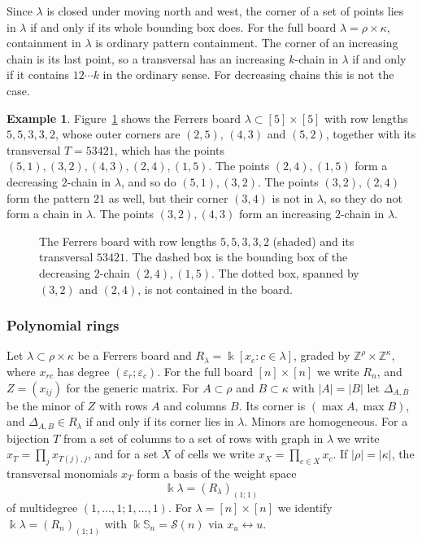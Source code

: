 \documentclass[11pt]{amsart}
\theoremstyle{definition}
\newtheorem{example}[theorem]{Example}
\theoremstyle{remark}
\newcommand{\bS}{\mathbb{S}}
\newcommand{\kk}{\Bbbk}
\newcommand{\cS}{\mathscr{S}}
\newcommand{\gridlines}[2]{\draw[gray!55,very thin] (0,0) grid (#1,-#2);}
\newcommand{\shaderows}[2][gray!22]{\foreach \x/\y in {#2}{\fill[#1] (0,1-\x) rectangle (\y,-\x);}}
\newcommand{\pt}[2]{\fill (#2-0.5,0.5-#1) circle (0.16);}
\begin{document}
Since $\lambda$ is closed under moving north and west, the corner of a set of points lies in $\lambda$ if and only if its whole bounding box does. For the full board $\lambda=\rho\times\kappa$, containment in $\lambda$ is ordinary pattern containment. The corner of an increasing chain is its last point, so a transversal has an increasing $k$-chain in $\lambda$ if and only if it contains $12\cdots k$ in the ordinary sense. For decreasing chains this is not the case.

\begin{example}\label{ex:board}
Figure~\ref{fig:board} shows the Ferrers board $\lambda\subset[5]\times[5]$ with row lengths $5,5,3,3,2$, whose outer corners are $(2,5)$, $(4,3)$ and $(5,2)$, together with its transversal $T=53421$, which has the points $(5,1),(3,2),(4,3),(2,4),(1,5)$. The points $(2,4),(1,5)$ form a decreasing $2$-chain in $\lambda$, and so do $(5,1),(3,2)$. The points $(3,2),(2,4)$ form the pattern $21$ as well, but their corner $(3,4)$ is not in $\lambda$, so they do not form a chain in $\lambda$. The points $(3,2),(4,3)$ form an increasing $2$-chain in $\lambda$.
\end{example}

\begin{figure}[ht]
\centering
{}
\caption{The Ferrers board with row lengths $5,5,3,3,2$ (shaded) and its transversal $53421$. The dashed box is the bounding box of the decreasing $2$-chain $(2,4),(1,5)$. The dotted box, spanned by $(3,2)$ and $(2,4)$, is not contained in the board.}\label{fig:board}
\end{figure}

\subsubsection{Polynomial rings}
Let $\lambda\subset\rho\times\kappa$ be a Ferrers board and $R_\lambda=\kk[x_c:c\in\lambda]$, graded by $\mathbb Z^\rho\times\mathbb Z^\kappa$, where $x_{rc}$ has degree $(\varepsilon_r;\varepsilon_c)$. For the full board $[n]\times[n]$ we write $R_n$, and $Z=(x_{ij})$ for the generic matrix. For $A\subset\rho$ and $B\subset\kappa$ with $|A|=|B|$ let $\Delta_{A,B}$ be the minor of $Z$ with rows $A$ and columns $B$. Its corner is $(\max A,\max B)$, and $\Delta_{A,B}\in R_\lambda$ if and only if its corner lies in $\lambda$. Minors are homogeneous. For a bijection $T$ from a set of columns to a set of rows with graph in $\lambda$ we write $x_T=\prod_jx_{T(j),j}$, and for a set $X$ of cells we write $x_X=\prod_{c\in X}x_c$. If $|\rho|=|\kappa|$, the transversal monomials $x_T$ form a basis of the weight space
\[
\kk\lambda=(R_\lambda)_{(1;1)}
\]
of multidegree $(1,\dots,1;1,\dots,1)$. For $\lambda=[n]\times[n]$ we identify $\kk\lambda=(R_n)_{(1;1)}$ with $\kk\bS_n=\cS(n)$ via $x_u\leftrightarrow u$.
\end{document}
